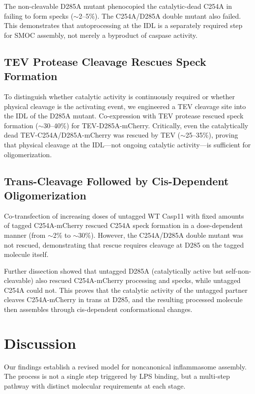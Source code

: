 \documentclass[11pt]{article}
\begin{document}
The non-cleavable D285A mutant phenocopied the catalytic-dead C254A in failing to form specks ($\sim$2--5\%). The C254A/D285A double mutant also failed. This demonstrates that autoprocessing at the IDL is a separately required step for SMOC assembly, not merely a byproduct of caspase activity.

\subsection{TEV Protease Cleavage Rescues Speck Formation}

To distinguish whether catalytic activity is continuously required or whether physical cleavage is the activating event, we engineered a TEV cleavage site into the IDL of the D285A mutant. Co-expression with TEV protease rescued speck formation ($\sim$30--40\%) for TEV-D285A-mCherry. Critically, even the catalytically dead TEV-C254A/D285A-mCherry was rescued by TEV ($\sim$25--35\%), proving that physical cleavage at the IDL---not ongoing catalytic activity---is sufficient for oligomerization.

\subsection{Trans-Cleavage Followed by Cis-Dependent Oligomerization}

Co-transfection of increasing doses of untagged WT Casp11 with fixed amounts of tagged C254A-mCherry rescued C254A speck formation in a dose-dependent manner (from $\sim$2\% to $\sim$30\%). However, the C254A/D285A double mutant was not rescued, demonstrating that rescue requires cleavage at D285 on the tagged molecule itself.

Further dissection showed that untagged D285A (catalytically active but self-non-cleavable) also rescued C254A-mCherry processing and specks, while untagged C254A could not. This proves that the catalytic activity of the untagged partner cleaves C254A-mCherry in trans at D285, and the resulting processed molecule then assembles through cis-dependent conformational changes.

\section{Discussion}

Our findings establish a revised model for noncanonical inflammasome assembly. The process is not a single step triggered by LPS binding, but a multi-step pathway with distinct molecular requirements at each stage.
\end{document}
